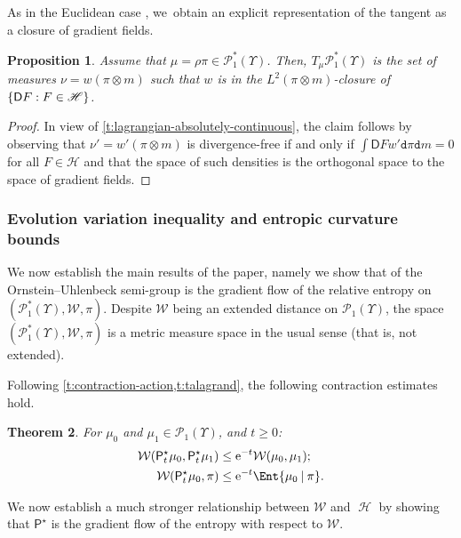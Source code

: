 \documentclass[JEP,XML,SOM,Unicode,published]{cedram}
\newtheorem{theorem}{Theorem}[section]
\newtheorem{proposition}[theorem]{Proposition}
\theoremstyle{definition}
\theoremstyle{remark}
\DeclarePairedDelimiter{\set}{\lbrace}{\rbrace}
\newcommand{\given}[1][]{%
\nonscript\:#1\vert
\allowbreak
\nonscript\:
\mathopen{}}
\DeclareMathOperator{\ent}{\mathcal{H}}
\begin{document}
As in the Euclidean case \cite[\S 8.1]{AGS}, we~obtain an explicit representation of the tangent as a closure of gradient fields.
\begin{proposition}
Assume that $\mu = \rho \pi \in \mathscr{P}^{*}_{1}(\varUpsilon)$.
Then, $T_{\mu} \mathscr{P}^{*}_{1}(\varUpsilon)$ is the set of measures $\nu = w (\pi \otimes m)$ such that $w$ is in the $L^{2}(\pi \otimes m)$-closure of $\set{ \mathsf{D} F : F \in \mathscr{H} }$.
\end{proposition}

\begin{proof}
In view of \cref{t:lagrangian-absolutely-continuous}, the claim follows by observing that $\nu' = w' (\pi \otimes m)$ is divergence-free if and only if $\int \mathsf{D} F w' \mathtt{d} \pi \mathtt{d} m = 0$ for all $F \in \mathscr{H}$ and that the space of such densities is the orthogonal space to the space of gradient fields.
\end{proof}

\subsubsection{Evolution variation inequality and entropic curvature bounds}

We now establish the main results of the paper, namely we show that of the Ornstein--Uhlenbeck semi-group is the gradient flow of the relative entropy on $(\mathscr{P}_{1}^{*}(\varUpsilon), \mathcal{W}, \pi)$.
Despite $\mathcal{W}$ being an extended distance on $\mathscr{P}_{1}(\varUpsilon)$, the space $(\mathscr{P}_{1}^{*}(\varUpsilon), \mathcal{W}, \pi)$ is a metric measure space in the usual sense (that is, not extended).

Following \cref{t:contraction-action,t:talagrand}, the following contraction estimates hold.

\begin{theorem}\label{t:dou-contractivity}
For $\mu_{0}$ and $\mu_{1} \in \mathscr{P}_{1}(\varUpsilon)$, and $t \geq 0$:
\begin{align}
\mathcal{W}(\mathsf{P}^{\star}_{t} \mu_{0}, \mathsf{P}^{\star}_{t} \mu_{1}) &\leq \mathrm{e}^{-t} \mathcal{W}(\mu_{0}, \mu_{1}); \\
\mathcal{W}(\mathsf{P}^{\star}_{t} \mu_{0}, \pi) &\leq \mathrm{e}^{-t} \Ent{ \mu_{0} \given \pi }.
\end{align}
\end{theorem}
We now establish a much stronger relationship between $\mathcal{W}$ and $\ent$ by showing that $\mathsf{P}^{\star}$ is the gradient flow of the entropy with respect to $\mathcal{W}$.
\end{document}
